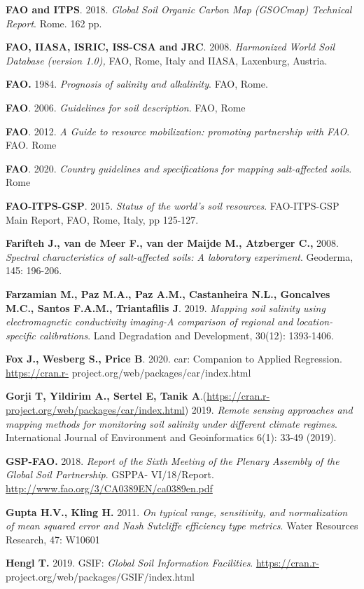 \documentclass[
  10pt,
  b5paper,
]{book}
\begin{document}
\textbf{FAO and ITPS}. 2018. \emph{Global Soil Organic Carbon Map (GSOCmap) Technical Report}. Rome. 162 pp.

\textbf{FAO, IIASA, ISRIC, ISS-CSA and JRC}. 2008. \emph{Harmonized World Soil Database (version 1.0),} FAO, Rome, Italy and IIASA, Laxenburg, Austria.

\textbf{FAO.} 1984. \emph{Prognosis of salinity and alkalinity}. FAO, Rome.

\textbf{FAO}. 2006. \emph{Guidelines for soil description}. FAO, Rome

\textbf{FAO}. 2012. \emph{A Guide to resource mobilization: promoting partnership with FAO}. FAO. Rome

\textbf{FAO}. 2020. \emph{Country guidelines and specifications for mapping salt-affected soils}. Rome

\textbf{FAO-ITPS-GSP}. 2015. \emph{Status of the world's soil resources}. FAO-ITPS-GSP Main Report, FAO, Rome, Italy, pp 125-127.

\textbf{Farifteh J., van de Meer F., van der Maijde M., Atzberger C.,} 2008. \emph{Spectral characteristics of salt-affected soils: A laboratory experiment}. Geoderma, 145: 196-206.

\textbf{Farzamian M., Paz M.A., Paz A.M., Castanheira N.L., Goncalves M.C., Santos F.A.M., Triantafilis J}. 2019. \emph{Mapping soil salinity using electromagnetic conductivity imaging-A comparison of regional and location- specific calibrations}. Land Degradation and Development, 30(12): 1393-1406.

\textbf{Fox J., Wesberg S., Price B}. 2020. car: Companion to Applied Regression. \url{https://cran.r-} project.org/web/packages/car/index.html

\textbf{Gorji T, Yildirim A., Sertel E, Tanik A}.(\url{https://cran.r-project.org/web/packages/car/index.html}) 2019. \emph{Remote sensing approaches and mapping methods for monitoring soil salinity under different climate regimes}. International Journal of Environment and Geoinformatics 6(1): 33-49 (2019).

\textbf{GSP-FAO.} 2018. \emph{Report of the Sixth Meeting of the Plenary Assembly of the Global Soil Partnership}. GSPPA- VI/18/Report. \url{http://www.fao.org/3/CA0389EN/ca0389en.pdf}

\textbf{Gupta H.V., Kling H.} 2011. \emph{On typical range, sensitivity, and normalization of mean squared error and Nash Sutcliffe efficiency type metrics}. Water Resources Research, 47: W10601

\textbf{Hengl T.} 2019. GSIF: \emph{Global Soil Information Facilities}. \url{https://cran.r-} project.org/web/packages/GSIF/index.html
\end{document}
